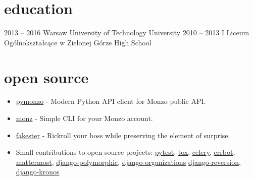 \documentclass[]{cv-style}  %
\begin{document}
\vspace{-0.3cm}


\section{education}
  \vspace{-0.3cm}

\begin{entrylist}
\entry
  {2013 -- 2016}
  {Warsaw University of Technology}
  {University}
  {}
\entry
  {2010 -- 2013}
  {I Liceum Ogólnokształcące w Zielonej Górze}
  {High School}
  {}
\end{entrylist}

\vspace{-0.5cm}


\section{open source}
  \vspace{-0.3cm}

\begin{itemize}
  \item \href{https://github.com/pawelad/pymonzo}{pymonzo} - Modern Python API client for Monzo public API.
  \item \href{https://github.com/pawelad/monz}{monz} - Simple CLI for your Monzo account.
  \item \href{https://github.com/pawelad/fakester}{fakester} - Rickroll your boss while preserving the element of surprise.
  \item Small contributions to open source projects: \href{https://github.com/pytest-dev/pytest}{pytest}, \href{https://github.com/tox-dev/tox}{tox}, \href{https://github.com/celery/celery}{celery}, \href{https://github.com/errbotio/errbot}{errbot}, \href{https://github.com/mattermost/mattermost}{mattermost}, \href{https://github.com/jazzband/django-polymorphic}{django-polymorphic}, \href{https://github.com/bennylope/django-organizations}{django-organizations} \href{https://github.com/etianen/django-reversion}{django-reversion}, \href{https://github.com/jgorset/django-kronos}{django-kronos}
\end{itemize}
\end{document}
